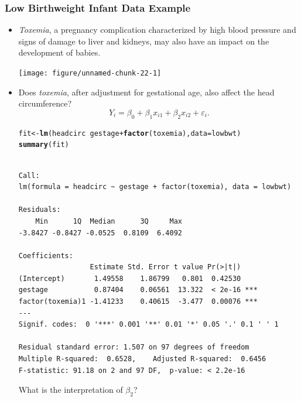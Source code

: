 \documentclass{article}\usepackage[]{graphicx}\usepackage[svgnames]{xcolor}
\makeatletter
\newcommand{\hlopt}[1]{\textcolor[rgb]{0,0,0}{#1}}%
\newcommand{\hlstd}[1]{\textcolor[rgb]{0.345,0.345,0.345}{#1}}%
\newcommand{\hlkwb}[1]{\textcolor[rgb]{0.69,0.353,0.396}{#1}}%
\newcommand{\hlkwc}[1]{\textcolor[rgb]{0.333,0.667,0.333}{#1}}%
\newcommand{\hlkwd}[1]{\textcolor[rgb]{0.737,0.353,0.396}{\textbf{#1}}}%
\newenvironment{kframe}{%
 \def\at@end@of@kframe{}%
 \ifinner\ifhmode%
  \def\at@end@of@kframe{\end{minipage}}%
  \begin{minipage}{\columnwidth}%
 \fi\fi%
 \def\FrameCommand##1{\hskip\@totalleftmargin \hskip-\fboxsep
 \colorbox{shadecolor}{##1}\hskip-\fboxsep
     \hskip-\linewidth \hskip-\@totalleftmargin \hskip\columnwidth}%
 \MakeFramed {\advance\hsize-\width
   \@totalleftmargin\z@ \linewidth\hsize
   \@setminipage}}%
 {\par\unskip\endMakeFramed%
 \at@end@of@kframe}
\newenvironment{knitrout}{}{} %
\makeatother
\begin{document}
\subsubsection*{Low Birthweight Infant Data Example}
\begin{itemize}
      \item \emph{Toxemia}, a pregnancy complication characterized by high blood pressure
            and signs of damage to liver and kidneys, may also have an impact on the
            development of babies.
\begin{knitrout}
\color{fgcolor}

{\centering \texttt{[image: figure/unnamed-chunk-22-1]} 

}


\end{knitrout}
      \item Does \emph{toxemia}, after adjustment for gestational age, also affect the head
            circumference?
            \[ Y_i=\beta_0+\beta_1x_{i1}+\beta_2x_{i2}+\varepsilon_i. \]
\begin{knitrout}
\color{fgcolor}\begin{kframe}
\begin{alltt}
\hlstd{fit} \hlkwb{<-} \hlkwd{lm}\hlstd{(headcirc} \hlopt{~} \hlstd{gestage} \hlopt{+} \hlkwd{factor}\hlstd{(toxemia),} \hlkwc{data} \hlstd{= lowbwt)}
\hlkwd{summary}\hlstd{(fit)}
\end{alltt}
\begin{verbatim}

Call:
lm(formula = headcirc ~ gestage + factor(toxemia), data = lowbwt)

Residuals:
    Min      1Q  Median      3Q     Max 
-3.8427 -0.8427 -0.0525  0.8109  6.4092 

Coefficients:
                 Estimate Std. Error t value Pr(>|t|)    
(Intercept)       1.49558    1.86799   0.801  0.42530    
gestage           0.87404    0.06561  13.322  < 2e-16 ***
factor(toxemia)1 -1.41233    0.40615  -3.477  0.00076 ***
---
Signif. codes:  0 '***' 0.001 '**' 0.01 '*' 0.05 '.' 0.1 ' ' 1

Residual standard error: 1.507 on 97 degrees of freedom
Multiple R-squared:  0.6528,	Adjusted R-squared:  0.6456 
F-statistic: 91.18 on 2 and 97 DF,  p-value: < 2.2e-16
\end{verbatim}
\end{kframe}
\end{knitrout}
            What is the interpretation of $ \beta_2 $?


\end{itemize}
\end{document}
